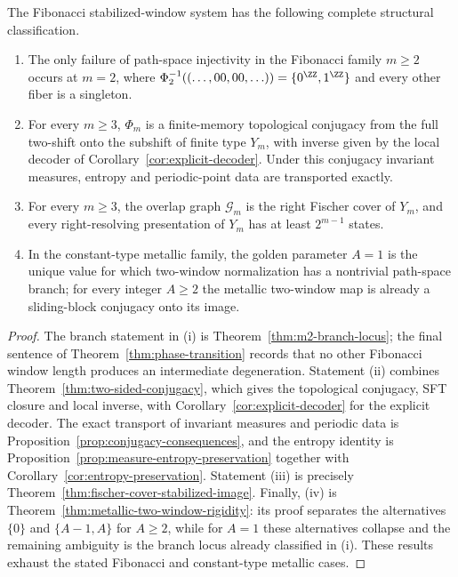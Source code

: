 \begin{theorem}
\label{thm:threshold-conjugacy-cover-package}
The Fibonacci stabilized-window system has the following complete structural
classification.
\begin{enumerate}[label=(\roman*),leftmargin=*,itemsep=2pt]
  \item The only failure of path-space injectivity in the Fibonacci family
  $m\ge2$ occurs at $m=2$, where
  $\Phi_2^{-1}((\ldots,00,00,\ldots))=\{0^{\ZZ},1^{\ZZ}\}$ and every other
  fiber is a singleton.
  \item For every $m\ge3$, $\Phi_m$ is a finite-memory topological conjugacy
  from the full two-shift onto the subshift of finite type $Y_m$, with inverse
  given by the local decoder of Corollary~\ref{cor:explicit-decoder}.  Under
  this conjugacy invariant measures, entropy and periodic-point data are
  transported exactly.
  \item For every $m\ge3$, the overlap graph $\mathcal G_m$ is the right
  Fischer cover of $Y_m$, and every right-resolving presentation of $Y_m$ has
  at least $2^{m-1}$ states.
  \item In the constant-type metallic family, the golden parameter $A=1$ is
  the unique value for which two-window normalization has a nontrivial
  path-space branch; for every integer $A\ge2$ the metallic two-window map is
  already a sliding-block conjugacy onto its image.
\end{enumerate}
\end{theorem}

\begin{proof}
The branch statement in (i) is Theorem~\ref{thm:m2-branch-locus}; the final
sentence of Theorem~\ref{thm:phase-transition} records that no other
Fibonacci window length produces an intermediate degeneration.  Statement
(ii) combines Theorem~\ref{thm:two-sided-conjugacy}, which gives the
topological conjugacy, SFT closure and local inverse, with
Corollary~\ref{cor:explicit-decoder} for the explicit decoder.  The exact
transport of invariant measures and periodic data is
Proposition~\ref{prop:conjugacy-consequences}, and the entropy identity is
Proposition~\ref{prop:measure-entropy-preservation} together with
Corollary~\ref{cor:entropy-preservation}.  Statement (iii) is precisely
Theorem~\ref{thm:fischer-cover-stabilized-image}.  Finally, (iv) is
Theorem~\ref{thm:metallic-two-window-rigidity}: its proof separates the
alternatives $\{0\}$ and $\{A-1,A\}$ for $A\ge2$, while for $A=1$ these
alternatives collapse and the remaining ambiguity is the branch locus already
classified in (i).  These results exhaust the stated Fibonacci and
constant-type metallic cases.
\end{proof}
